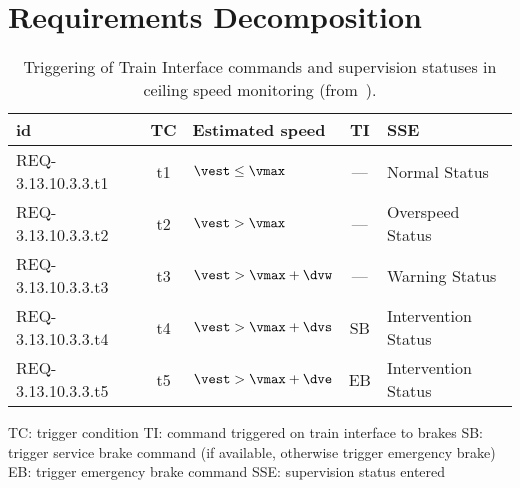 \section{Requirements Decomposition}

\begin{table}
\caption{Triggering of Train Interface commands and supervision statuses in ceiling speed monitoring (from~\cite[Table~5]{ETCSSRS-Principles}).}
\begin{center}
\footnotesize
\begin{tabular}{|l|c|l|c|l|}
\hline\hline
{\bf id} & {\bf TC} & {\bf Estimated speed} & {\bf TI} & {\bf SSE} 
\\\hline\hline
REQ-3.13.10.3.3.t1 & t1 & $\vest \le \vmax$ & --- & Normal Status
\\\hline
REQ-3.13.10.3.3.t2 & t2 & $\vest > \vmax$ & --- & Overspeed Status
\\\hline
REQ-3.13.10.3.3.t3 & t3 & $\vest > \vmax + \dvw$ & --- & Warning Status
\\\hline
REQ-3.13.10.3.3.t4 & t4 & $\vest > \vmax + \dvs$ & SB & Intervention Status
\\\hline
REQ-3.13.10.3.3.t5 & t5 & $\vest > \vmax + \dve$ & EB & Intervention Status  
\\\hline\hline
\end{tabular}
\normalsize
\end{center}

TC: trigger condition \newline
TI: command triggered on train interface to brakes \newline
SB: trigger service brake command (if available, otherwise trigger emergency brake)\newline
EB: trigger emergency brake command 
SSE: supervision status entered
\label{tab:five}
\end{table}%


